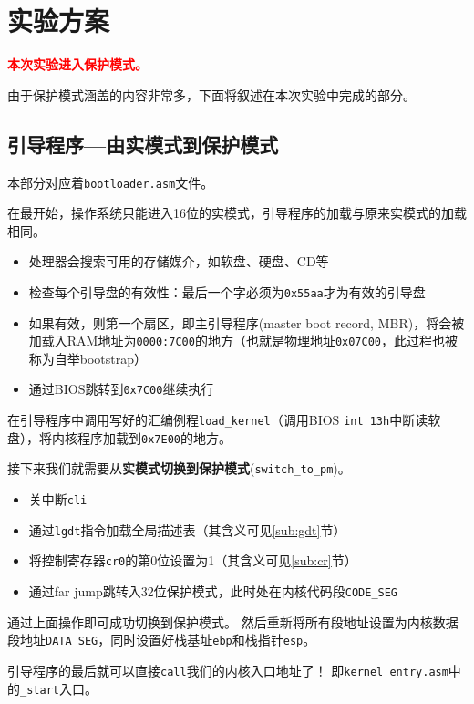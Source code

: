 \documentclass[logo,reportComp]{thesis}
\begin{document}
\section{实验方案}
{\Large\textbf{\textcolor{red}{本次实验进入保护模式。}}}

由于保护模式涵盖的内容非常多，下面将叙述在本次实验中完成的部分。

\subsection{引导程序---由实模式到保护模式}
本部分对应着\verb'bootloader.asm'文件。

在最开始，操作系统只能进入16位的实模式，引导程序的加载与原来实模式的加载相同。
\begin{itemize}
	\item 处理器会搜索可用的存储媒介，如软盘、硬盘、CD等
	\item 检查每个引导盘的有效性：最后一个字必须为\verb'0x55aa'才为有效的引导盘
	\item 如果有效，则第一个扇区，即主引导程序(master boot record, MBR)，将会被加载入RAM地址为\verb'0000:7C00'的地方（也就是物理地址\verb'0x07C00'，此过程也被称为自举bootstrap）
	\item 通过BIOS跳转到\verb'0x7C00'继续执行
\end{itemize}

在引导程序中调用写好的汇编例程\verb'load_kernel'（调用BIOS \verb'int 13h'中断读软盘），将内核程序加载到\verb'0x7E00'的地方。

接下来我们就需要从\textbf{实模式切换到保护模式}(\verb'switch_to_pm')。
\begin{itemize}
	\item 关中断\verb'cli'
	\item 通过\verb'lgdt'指令加载全局描述表（其含义可见\ref{sub:gdt}节）
	\item 将控制寄存器\verb'cr0'的第0位设置为1（其含义可见\ref{sub:cr}节）
	\item 通过far jump跳转入32位保护模式，此时处在内核代码段\verb'CODE_SEG'
\end{itemize}

通过上面操作即可成功切换到保护模式。
然后重新将所有段地址设置为内核数据段地址\verb'DATA_SEG'，同时设置好栈基址\verb'ebp'和栈指针\verb'esp'。

引导程序的最后就可以直接\verb'call'我们的内核入口地址了！
即\verb'kernel_entry.asm'中的\verb'_start'入口。
\end{document}
